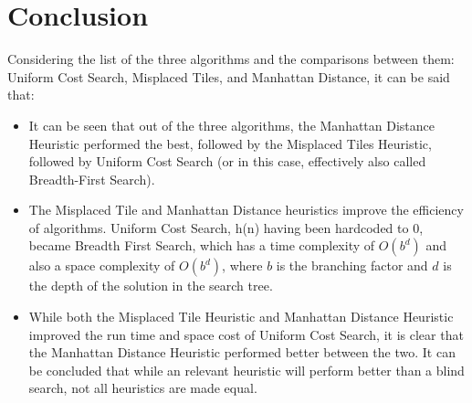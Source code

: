 \documentclass[a4paper]{article}
\begin{document}
\section{Conclusion}
Considering the list of the three algorithms and the comparisons between them:
Uniform Cost Search, Misplaced Tiles, and Manhattan Distance, it can be said that:
\begin{itemize}
  \item It can be seen that out of the three algorithms, the Manhattan Distance
    Heuristic performed the best, followed by the Misplaced Tiles Heuristic,
    followed by Uniform Cost Search (or in this case, effectively also called
    Breadth-First Search).
\item The Misplaced Tile and Manhattan Distance heuristics improve the
  efficiency of algorithms. Uniform Cost Search, h(n) having been hardcoded to
  0, became Breadth First Search, which has a time complexity of $O(b^d)$ and
  also a space complexity of $O(b^d)$, where $b$ is the branching factor and $d$
  is the depth of the solution in the search tree.
  \item While both the Misplaced Tile Heuristic and Manhattan Distance Heuristic
    improved the run time and space cost of Uniform Cost Search, it is clear
    that the Manhattan Distance Heuristic performed better between the two.
    It can be concluded that while an relevant heuristic will perform better
    than a blind search, not all heuristics are made equal.
  \end{itemize}
\end{document}
